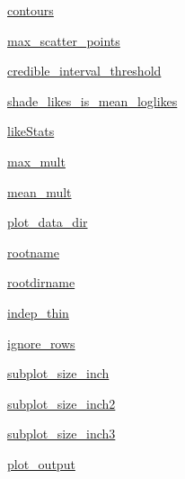 \begin{DoxyCompactItemize}
\item 
\mbox{\hyperlink{classgetdist_1_1mcsamples_1_1MCSamples_aa08ea0e345f3e48afbb9555a65992e0e}{contours}}
\item 
\mbox{\hyperlink{classgetdist_1_1mcsamples_1_1MCSamples_ae265d3af09acbb077770f5762d617bbd}{max\+\_\+scatter\+\_\+points}}
\item 
\mbox{\hyperlink{classgetdist_1_1mcsamples_1_1MCSamples_ae6de9abfa4dd81d63619deb0b8d8d21a}{credible\+\_\+interval\+\_\+threshold}}
\item 
\mbox{\hyperlink{classgetdist_1_1mcsamples_1_1MCSamples_a76268ae111ba7d2a1986811199fbce4d}{shade\+\_\+likes\+\_\+is\+\_\+mean\+\_\+loglikes}}
\item 
\mbox{\hyperlink{classgetdist_1_1mcsamples_1_1MCSamples_aed89837625f0994b73e51e1aaac48d4e}{like\+Stats}}
\item 
\mbox{\hyperlink{classgetdist_1_1mcsamples_1_1MCSamples_af62f46d2577d5027a3f1753378f40dff}{max\+\_\+mult}}
\item 
\mbox{\hyperlink{classgetdist_1_1mcsamples_1_1MCSamples_a535d73265902667e6a834a61d3393aac}{mean\+\_\+mult}}
\item 
\mbox{\hyperlink{classgetdist_1_1mcsamples_1_1MCSamples_aeccbc5809b633212cc9b2129737ac438}{plot\+\_\+data\+\_\+dir}}
\item 
\mbox{\hyperlink{classgetdist_1_1mcsamples_1_1MCSamples_aa211faf32302de7b8ee93457ac8c731a}{rootname}}
\item 
\mbox{\hyperlink{classgetdist_1_1mcsamples_1_1MCSamples_a3ecc987ed0811e58320adc64fc0ae1af}{rootdirname}}
\item 
\mbox{\hyperlink{classgetdist_1_1mcsamples_1_1MCSamples_a75f98c2fd0e3db11d52ecfef12f95a49}{indep\+\_\+thin}}
\item 
\mbox{\hyperlink{classgetdist_1_1mcsamples_1_1MCSamples_aba8e14e2f06bcbc1ac579c95bbb82715}{ignore\+\_\+rows}}
\item 
\mbox{\hyperlink{classgetdist_1_1mcsamples_1_1MCSamples_a41bc4204c22eade35a3b4d65ed7bfbb6}{subplot\+\_\+size\+\_\+inch}}
\item 
\mbox{\hyperlink{classgetdist_1_1mcsamples_1_1MCSamples_ad5bb6af260d1d72e2e5ff6cf58117999}{subplot\+\_\+size\+\_\+inch2}}
\item 
\mbox{\hyperlink{classgetdist_1_1mcsamples_1_1MCSamples_ab22efaa2b450c1f8a188fcecac801b2f}{subplot\+\_\+size\+\_\+inch3}}
\item 
\mbox{\hyperlink{classgetdist_1_1mcsamples_1_1MCSamples_a7e10b0965f40b8d8f51b6a13c7e0985b}{plot\+\_\+output}}
\item 

\end{DoxyCompactItemize}
